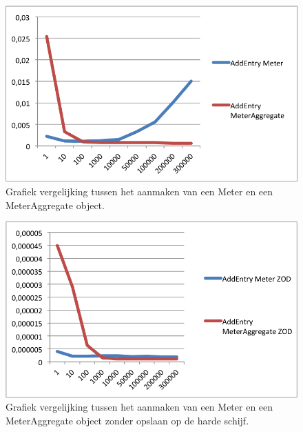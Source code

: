 \begin{figure}[!h]
  \centering
  \includegraphics[scale=1.0]{Afbeeldingen/Evaluatie/MeterVSAggregate}
  \caption{Grafiek vergelijking tussen het aanmaken van een Meter en een MeterAggregate object.}
  \label{fig:MeterVSAggregate}
\end{figure}

\begin{figure}[!h]
  \centering
  \includegraphics[scale=1.0]{Afbeeldingen/Evaluatie/MeterVSAggregateZOD}
  \caption{Grafiek vergelijking tussen het aanmaken van een Meter en een MeterAggregate object zonder opslaan op de harde schijf.}
  \label{fig:MeterVSAggregateZOD}
\end{figure}

